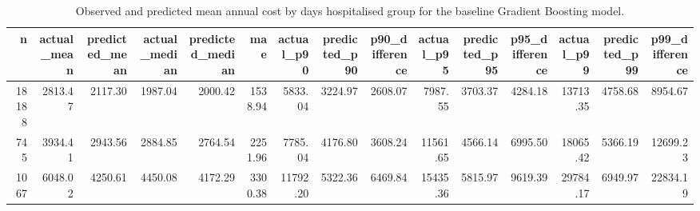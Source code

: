 \begin{table}
\caption{Observed and predicted mean annual cost by days hospitalised group for the baseline Gradient Boosting model.}
\label{tab:05-gb-group-summary-days-hospitalised}
\begin{tabular}{rrrrrrrrrrrrrrr}
\toprule
n & actual_mean & predicted_mean & actual_median & predicted_median & mae & actual_p90 & predicted_p90 & p90_difference & actual_p95 & predicted_p95 & p95_difference & actual_p99 & predicted_p99 & p99_difference \\
\midrule
18188 & 2813.47 & 2117.30 & 1987.04 & 2000.42 & 1538.94 & 5833.04 & 3224.97 & 2608.07 & 7987.55 & 3703.37 & 4284.18 & 13713.35 & 4758.68 & 8954.67 \\
745 & 3934.41 & 2943.56 & 2884.85 & 2764.54 & 2251.96 & 7785.04 & 4176.80 & 3608.24 & 11561.65 & 4566.14 & 6995.50 & 18065.42 & 5366.19 & 12699.23 \\
1067 & 6048.02 & 4250.61 & 4450.08 & 4172.29 & 3300.38 & 11792.20 & 5322.36 & 6469.84 & 15435.36 & 5815.97 & 9619.39 & 29784.17 & 6949.97 & 22834.19 \\
\bottomrule
\end{tabular}
\end{table}
